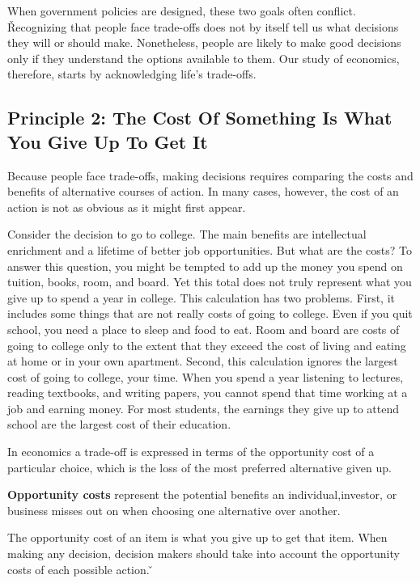 When government policies are designed, these two goals often conflict. \v

Recognizing that people face trade-offs does not by itself tell us what decisions they will or should make.
Nonetheless, people are likely to make good decisions only if they understand the options available to them. Our
study of economics, therefore, starts by acknowledging life's trade-offs.

\subsection*{Principle 2: The Cost Of Something Is What You Give Up To Get It}

Because people face trade-offs, making decisions requires comparing the costs and benefits of alternative courses of
action. In many cases, however, the cost of an action is not as obvious as it might first appear.

\be
Consider the decision to go to college. The main benefits are intellectual enrichment and a lifetime of better job
opportunities. But what are the costs? To answer this question, you might be tempted to add up the money you spend on
tuition, books, room, and board. Yet this total does not truly represent what you give up to spend a year in college.
This calculation has two problems. First, it includes some things that are not really costs of going to college. Even
if you quit school, you need a place to sleep and food to eat. Room and board are costs of going to college only to
the extent that they exceed the cost of living and eating at home or in your own apartment. Second, this calculation
ignores the largest cost of going to college, your time. When you spend a year listening to lectures, reading
textbooks, and writing papers, you cannot spend that time working at a job and earning money. For most students, the
earnings they give up to attend school are the largest cost of their education.
\ee

In economics a trade-off is expressed in terms of the opportunity cost of a particular choice, which is the loss of
the most preferred alternative given up.

\textbf{Opportunity costs} represent the potential benefits an individual,investor, or business misses out on when
choosing one alternative over another.
\ed

The opportunity cost of an item is what you give up to get that item. When making any decision, decision makers
should take into account the opportunity costs of each possible action. \v

